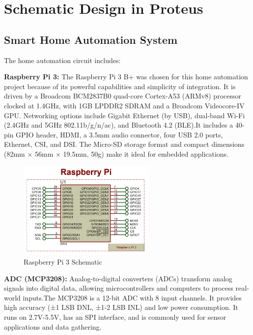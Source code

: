 \documentclass[a4paper,12pt]{report}
\begin{document}
\section{Schematic Design in Proteus}
\subsection{Smart Home Automation System}
The home automation circuit includes:

\textbf{Raspberry Pi 3:} The Raspberry Pi 3 B+ was chosen for this home automation project because of its powerful capabilities and simplicity of integration.  It is driven by a Broadcom BCM2837B0 quad-core Cortex-A53 (ARMv8) processor clocked at 1.4GHz, with 1GB LPDDR2 SDRAM and a Broadcom Videocore-IV GPU. Networking options include Gigabit Ethernet (by USB), dual-band Wi-Fi (2.4GHz and 5GHz 802.11b/g/n/ac), and Bluetooth 4.2 (BLE)\cite{valov2020home}.It includes a 40-pin GPIO header, HDMI, a 3.5mm audio connector, four USB 2.0 ports, Ethernet, CSI, and DSI.  The Micro-SD storage format and compact dimensions (82mm × 56mm × 19.5mm, 50g) make it ideal for embedded applications\cite{valov2020home}.

\begin{figure}[H]  %
    \centering
    \includegraphics[width=0.6\textwidth]{image.png} %
    \caption{Raspberry Pi 3 Schematic}
    \label{fig:Raspberry} %
\end{figure}


\textbf{ADC (MCP3208):} Analog-to-digital converters (ADCs) transform analog signals into digital data, allowing microcontrollers and computers to process real-world inputs.The MCP3208 is a 12-bit ADC with 8 input channels. It provides high accuracy (±1 LSB DNL, ±1-2 LSB INL) and low power consumption.  It runs on 2.7V-5.5V, has an SPI interface, and is commonly used for sensor applications and data gathering\cite{Dout199927V41}.
\end{document}
